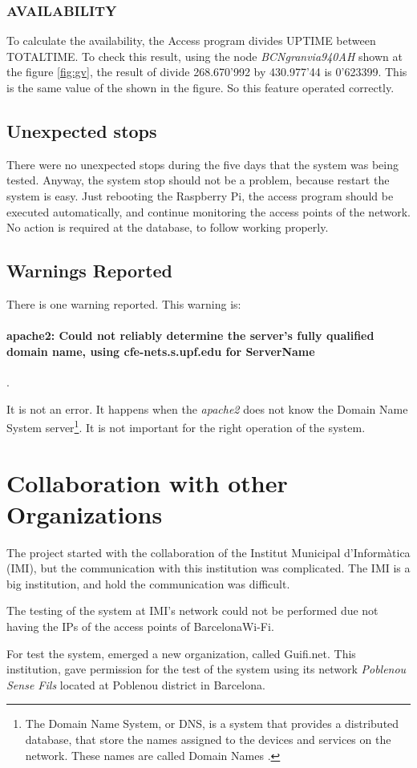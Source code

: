 \documentclass[12pt, a4paper,twoside]{tesi_upf}
\begin{document}
{    
    \subsubsection{AVAILABILITY}
    To calculate the availability, the Access program divides UPTIME between TOTALTIME. 
    To check this result, using the node \emph{BCNgranvia940AH} shown at the figure \ref{fig:gv}, the result of divide 268.670'992 by 430.977'44 is 0'623399. This is the same value of the shown in the figure. So this feature operated correctly.
    
    \subsection{Unexpected stops}
    There were no unexpected stops during the five days that the system was being tested.
Anyway, the system stop should not be a problem, because restart the system is easy. Just rebooting the Raspberry Pi, the access program should be executed automatically, and continue monitoring the access points of the network. No action is required at the database, to follow working properly.
    
    \subsection{Warnings Reported}
    There is one warning reported. This warning is:
    
    \paragraph{apache2: Could not reliably determine the server's fully qualified domain name, using cfe-nets.s.upf.edu for ServerName}.
    
    It is not an error. It happens when the \textit{apache2} does not know the Domain Name System server\footnote{The Domain Name System, or DNS, is a system that provides a distributed database, that store the names assigned to the devices and services on the network. These names are called Domain Names \cite{DNS}.}. It is not important for the right operation of the system.
    
    \section{Collaboration with other Organizations}
    
    The project started with the collaboration of the Institut Municipal d'Informàtica (IMI), but the communication with this institution was complicated. The IMI is a big institution, and hold the communication was difficult.
    
    The testing of the system at IMI's network could not be performed due not having the IPs of the access points of BarcelonaWi-Fi.
    
    For test the system, emerged a new organization, called Guifi.net. This institution, gave permission for the test of the system using its network \emph{Poblenou Sense Fils} located at Poblenou district in Barcelona.} 
    
\end{document}
